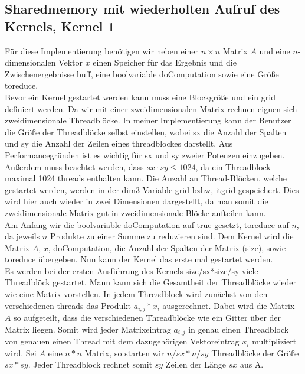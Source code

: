 \documentclass[10pt,a4paper]{article}
\begin{document}
	\subsection{Sharedmemory mit wiederholten Aufruf des Kernels, Kernel 1}
	Für diese Implementierung benötigen wir neben einer $n\times n$ Matrix $A$ und eine $n$-dimensionalen Vektor $x$ einen Speicher für das Ergebnis und die Zwischenergebnisse buff, eine boolvariable doComputation sowie eine Größe toreduce.\\
	Bevor ein Kernel gestartet werden kann muss eine Blockgröße und ein grid definiert werden.
	Da wir mit einer zweidimensionalen Matrix rechnen eignen sich zweidimensionale Threadblöcke.
	In meiner Implementierung kann der Benutzer die Größe der Threadblöcke selbst einstellen, wobei sx die Anzahl der Spalten und sy die Anzahl der Zeilen eines threadblockes darstellt.
	Aus Performancegründen ist es wichtig für sx und sy zweier Potenzen einzugeben. Außerdem muss beachtet werden, dass $sx\cdot sy\leq 1024$, da ein Threadblock maximal 1024 threads enthalten kann. Die Anzahl an Thread-Blöcken, welche gestartet werden, werden in der dim3 Variable grid bzhw, itgrid gespeichert. Dies wird hier auch wieder in zwei Dimensionen dargestellt, da man somit die zweidimensionale Matrix gut in zweidimensionale Blöcke aufteilen kann. \\ 
	Am Anfang wir die boolvariable doComputation auf true gesetzt, toreduce auf $n$, da jeweils $n$ Produkte zu einer Summe zu reduzieren sind. Dem Kernel wird die Matrix $A$, $x$, doComputation, die Anzahl der Spalten der Matrix (size), sowie toreduce übergeben. Nun kann der Kernel das erste mal gestartet werden.\\
	Es werden bei der ersten Ausführung des Kernels size/sx*size/sy viele Threadblöck gestartet. Mann kann sich die Gesamtheit der Threadblöcke wieder wie eine Matrix vorstellen. In jedem Threadblock wird zunächst von den verschiedenen threads das Produkt $a_{i,j}*x_i$ ausgerechnet. Dabei wird die Matrix $A$ so aufgeteilt, dass die verschiedenen Threadblöcke wie ein Gitter über der Matrix liegen. Somit wird jeder Matrixeintrag $a_{i,j}$ in genau einen Threadblock von genauen einen Thread mit dem dazugehörigen Vektoreintrag $x_i$ multipliziert wird. Sei $A$ eine $n*n$ Matrix, so starten wir $n/sx*n/sy$ Threadblöcke der Größe $sx*sy$. Jeder Threadblock rechnet somit $sy$ Zeilen der Länge $sx$ aus A. 
\end{document}
